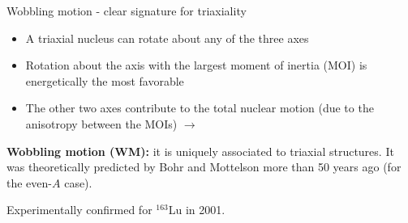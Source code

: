 \documentclass{beamer}
\begin{document}
\begin{frame}{Wobbling motion  - clear signature for triaxiality}
  \begin{itemize}
    \item A triaxial nucleus can rotate about any of the three axes
    \item Rotation about the axis with the largest moment of inertia (MOI) is energetically the most favorable
    \item The other two axes contribute to the total nuclear motion (due to the anisotropy between the MOIs) $\to$ \color{red}{This motion has an oscillating behavior} 
  \end{itemize}
  \textbf{Wobbling motion (WM):} it is uniquely associated to triaxial structures. It was theoretically predicted by Bohr and Mottelson more than 50 years ago (for the even-$A$ case).
  \par Experimentally confirmed for $^{163}$Lu in 2001.
\end{frame}
\end{document}
